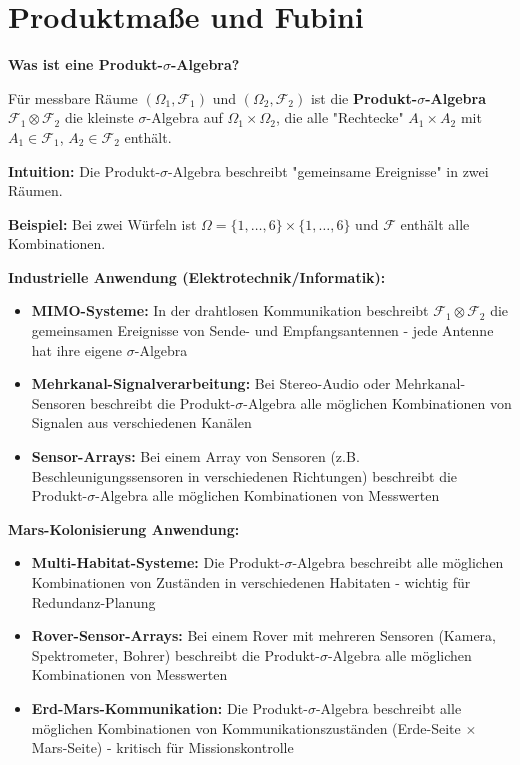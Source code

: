 \section{Produktmaße und Fubini}

\begin{denoobification}
\textbf{Was ist eine Produkt-$\sigma$-Algebra?}

Für messbare Räume $(\Omega_1, \mathcal{F}_1)$ und $(\Omega_2, \mathcal{F}_2)$ ist die \textbf{Produkt-$\sigma$-Algebra} $\mathcal{F}_1 \otimes \mathcal{F}_2$ die kleinste $\sigma$-Algebra auf $\Omega_1 \times \Omega_2$, die alle "Rechtecke" $A_1 \times A_2$ mit $A_1 \in \mathcal{F}_1$, $A_2 \in \mathcal{F}_2$ enthält.

\textbf{Intuition:} Die Produkt-$\sigma$-Algebra beschreibt "gemeinsame Ereignisse" in zwei Räumen.

\textbf{Beispiel:} Bei zwei Würfeln ist $\Omega = \{1, \ldots, 6\} \times \{1, \ldots, 6\}$ und $\mathcal{F}$ enthält alle Kombinationen.

\textbf{Industrielle Anwendung (Elektrotechnik/Informatik):}
\begin{itemize}
    \item \textbf{MIMO-Systeme:} In der drahtlosen Kommunikation beschreibt $\mathcal{F}_1 \otimes \mathcal{F}_2$ die gemeinsamen Ereignisse von Sende- und Empfangsantennen - jede Antenne hat ihre eigene $\sigma$-Algebra
    \item \textbf{Mehrkanal-Signalverarbeitung:} Bei Stereo-Audio oder Mehrkanal-Sensoren beschreibt die Produkt-$\sigma$-Algebra alle möglichen Kombinationen von Signalen aus verschiedenen Kanälen
    \item \textbf{Sensor-Arrays:} Bei einem Array von Sensoren (z.B. Beschleunigungssensoren in verschiedenen Richtungen) beschreibt die Produkt-$\sigma$-Algebra alle möglichen Kombinationen von Messwerten
\end{itemize}

\textbf{Mars-Kolonisierung Anwendung:}
\begin{itemize}
    \item \textbf{Multi-Habitat-Systeme:} Die Produkt-$\sigma$-Algebra beschreibt alle möglichen Kombinationen von Zuständen in verschiedenen Habitaten - wichtig für Redundanz-Planung
    \item \textbf{Rover-Sensor-Arrays:} Bei einem Rover mit mehreren Sensoren (Kamera, Spektrometer, Bohrer) beschreibt die Produkt-$\sigma$-Algebra alle möglichen Kombinationen von Messwerten
    \item \textbf{Erd-Mars-Kommunikation:} Die Produkt-$\sigma$-Algebra beschreibt alle möglichen Kombinationen von Kommunikationszuständen (Erde-Seite $\times$ Mars-Seite) - kritisch für Missionskontrolle
\end{itemize}


\end{denoobification}
